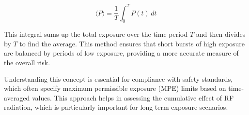 \[
\langle P \rangle = \frac{1}{T} \int_{0}^{T} P(t) \, dt
\]

This integral sums up the total exposure over the time period \( T \) and then divides by \( T \) to find the average. This method ensures that short bursts of high exposure are balanced by periods of low exposure, providing a more accurate measure of the overall risk.

Understanding this concept is essential for compliance with safety standards, which often specify maximum permissible exposure (MPE) limits based on time-averaged values. This approach helps in assessing the cumulative effect of RF radiation, which is particularly important for long-term exposure scenarios.

